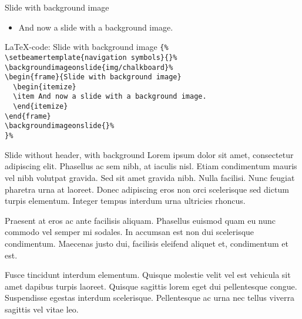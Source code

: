 \documentclass[t,11pt]{beamer}
\begin{document}
\begin{frame}{Slide with background image}
\begin{itemize}
\item And now a slide with a background image.
\end{itemize}
\end{frame}
\backgroundimageonslide{}

\toggleslidecolors
\begin{frame}[fragile]{\LaTeX-code: Slide with background image}
\footnotesize
\verb|{%|\\
\verb|\setbeamertemplate{navigation symbols}{}%|\\
\verb|\backgroundimageonslide{img/chalkboard}%|\\
\verb|\begin{frame}{Slide with background image}|\\
\verb|  \begin{itemize}|\\
\verb|  \item And now a slide with a background image.|\\
\verb|  \end{itemize}|\\
\verb|\end{frame}|\\
\verb|\backgroundimageonslide{}%|\\
\verb|}%|\\
\end{frame}
\toggleslidecolors

{
\begin{frame}[plain]{Slide without header, with background}
Lorem ipsum dolor sit amet, consectetur adipiscing elit. Phasellus ac sem nibh, at iaculis nisl. Etiam condimentum mauris vel nibh volutpat gravida. Sed sit amet gravida nibh. Nulla facilisi. Nunc feugiat pharetra urna at laoreet. Donec adipiscing eros non orci scelerisque sed dictum turpis elementum. Integer tempus interdum urna ultricies rhoncus.
\vspace{\baselineskip}

Praesent at eros ac ante facilisis aliquam. Phasellus euismod quam eu nunc commodo vel semper mi sodales. In accumsan est non dui scelerisque condimentum. Maecenas justo dui, facilisis eleifend aliquet et, condimentum et est.
\vspace{\baselineskip}

Fusce tincidunt interdum elementum. Quisque molestie velit vel est vehicula sit amet dapibus turpis laoreet. Quisque sagittis lorem eget dui pellentesque congue. Suspendisse egestas interdum scelerisque. Pellentesque ac urna nec tellus viverra sagittis vel vitae leo.
\end{frame}
\backgroundimageonslide{}
}
\end{document}
